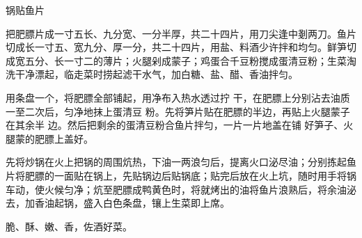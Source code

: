 \begin{recipe}{锅贴鱼片}

\ingredients



\cooking

\step 把肥膘片成一寸五长、九分宽、一分半厚，共二十四片，用刀尖逢中剗两刀。鱼片切成长一寸五、宽九分、厚一分，共二十四片，用盐、料酒少许拌和均匀。鲜笋切成宽五分、长一寸二的薄片；火腿剁成蒙子；鸡蛋合千豆粉搅成蛋清豆粉；生菜淘洗干净漂起，临走菜时捞起滤干水气，加白糖、盐、醋、香油拌匀。

用条盘一个，将肥膘全部铺起，用净布入热水透过拧 干，在肥膘上分别沾去油质一至二次后，匀净地抹上蛋清豆 粉。先将笋片贴在肥膘的半边，再贴上火腿蒙子在其余半 边。然后把剩余的蛋清豆粉合鱼片拌匀，一片一片地盖在铺 好笋子、火腿蒙的肥膘上盖好。

\step 先将炒锅在火上把锅的周围炕热，下油一两浪匀后，提离火口泌尽油；分别拣起鱼片将肥膘的一面贴在锅上，先贴锅边后贴锅底；贴完后放在火上坑，随时用手将锅车动，使火候匀净；炕至肥膘成鸭黄色时，将就烤出的油将鱼片浪熟后，将余油泌去，加香油起锅，盛入白色条盘，镶上生菜即上席。

\notes

脆、酥、嫩、香，佐酒好菜。

\end{recipe}

